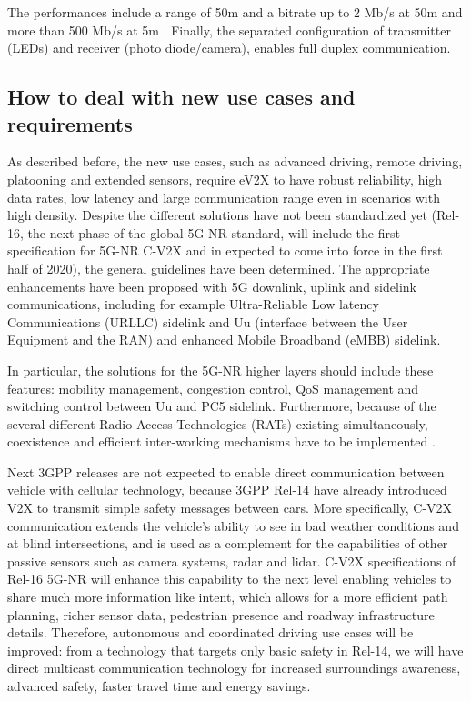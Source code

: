 \documentclass[conference,12pt,onecolumn]{IEEEtran}
\begin{document}
\begin{itemize}
The performances include a range of 50m and a bitrate up to 2 Mb/s at 50m and more than 500 Mb/s at 5m \cite{yu2013}. Finally, the separated configuration of transmitter (LEDs) and receiver (photo diode/camera), enables full duplex communication.
\end{itemize}

\subsection*{How to deal with new use cases and requirements}
As described before, the new use cases, such as advanced driving, remote driving, platooning and extended sensors, require eV2X to have robust reliability, high data rates, low latency and large communication range even in scenarios with high density. Despite the different solutions have not been standardized yet (Rel-16, the next phase of the global 5G-NR standard, will include the first specification for 5G-NR C-V2X and in expected to come into force in the first half of 2020), the general guidelines have been determined.  The appropriate enhancements have been proposed with 5G downlink, uplink and sidelink communications, including for example Ultra-Reliable Low latency Communications (URLLC) sidelink and Uu (interface between the User Equipment and the RAN) and enhanced Mobile Broadband (eMBB) sidelink.

In particular, the solutions for the 5G-NR higher layers should include these features: mobility management, congestion control, QoS management and switching control between Uu and PC5 sidelink. Furthermore, because of the several different Radio Access Technologies (RATs) existing simultaneously,  coexistence and efficient inter-working mechanisms have to be implemented \cite{chen2017vehicle}.

Next 3GPP releases are not expected to enable direct communication between vehicle with cellular technology, because 3GPP Rel-14 have already introduced V2X to transmit simple safety messages between cars. More specifically, C-V2X communication extends the vehicle's ability to see in bad weather conditions and at blind intersections, and is used as a complement for the capabilities of other passive sensors such as camera systems, radar and lidar. C-V2X specifications of Rel-16 5G-NR will enhance this capability to the next level enabling vehicles to share much more information like intent, which allows for a more efficient path planning, richer sensor data, pedestrian presence and roadway infrastructure details. Therefore, autonomous and coordinated driving use cases will be improved: from a technology that targets only basic safety in Rel-14, we will have direct multicast communication technology for increased surroundings awareness, advanced safety, faster travel time and energy savings. 
\end{document}
